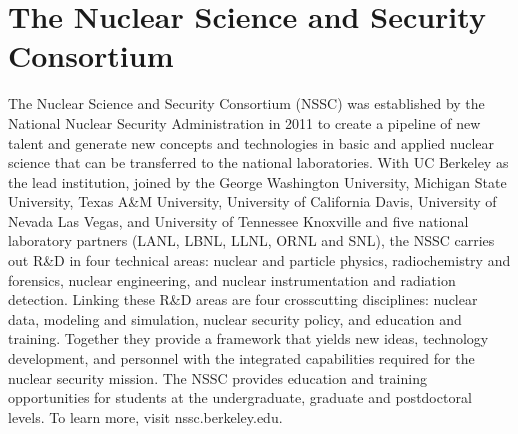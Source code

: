 
\section*{The Nuclear Science and Security Consortium}

The Nuclear Science and Security Consortium (NSSC) was established by the National Nuclear Security Administration in 2011 to create a pipeline of new talent and generate new concepts and technologies in basic and applied nuclear science that can be transferred to the national laboratories. 
With UC Berkeley as the lead institution, joined by the George Washington University, Michigan State University, Texas A\&M University, University of California Davis, University of Nevada Las Vegas, and University of Tennessee Knoxville and five national laboratory partners (LANL, LBNL, LLNL, ORNL and SNL), the NSSC carries out R\&D in four technical areas: nuclear and particle physics, radiochemistry and forensics, nuclear engineering, and nuclear instrumentation and radiation detection. 
Linking these R\&D areas are four crosscutting disciplines: nuclear data, modeling and simulation, nuclear security policy, and education and training. 
Together they provide a framework that yields new ideas, technology development, and personnel with the integrated capabilities required for the nuclear security mission. 
The NSSC provides education and training opportunities for students at the undergraduate, graduate and postdoctoral levels. 
To learn more, visit nssc.berkeley.edu.

